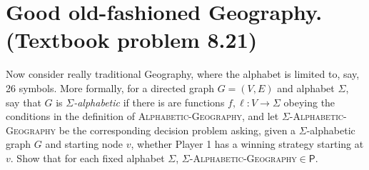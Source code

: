 

\maketitle
\thispagestyle{firststyle}
\vspace{-2.0cm}

\section{Good old-fashioned Geography. (Textbook problem 8.21)}
Now consider really traditional Geography, where the alphabet is limited to, say, 26 symbols.
More formally,
for a directed graph $G=(V,E)$ and alphabet $\Sigma$,
say that $G$ is \emph{$\Sigma$-alphabetic} if there is are functions $f,\ell:V \to \Sigma$
obeying the conditions in the definition of \textsc{Alphabetic-Geography},
and let $\Sigma$\textsc{-Alphabetic-Geography} be the corresponding decision problem asking,
given a $\Sigma$-alphabetic graph $G$ and starting node $v$,
whether Player 1 has a winning strategy starting at $v$.
Show that for each fixed alphabet $\Sigma$,
$\Sigma$\textsc{-Alphabetic-Geography}$\in\mathsf{P}$.


